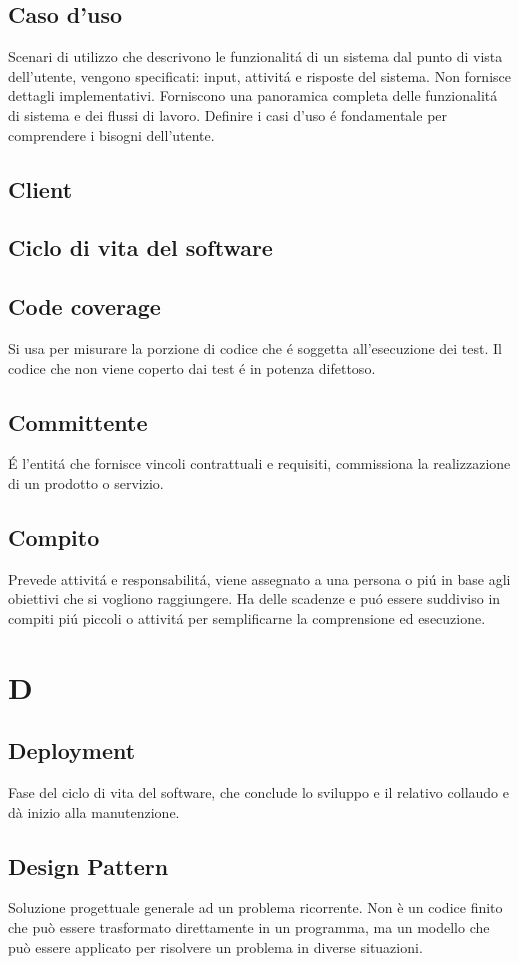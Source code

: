 \documentclass[12pt]{article}
\begin{document}
		\subsection{Caso d'uso}
			Scenari di utilizzo che descrivono le funzionalit\'a di un sistema dal punto di vista dell'utente, vengono specificati: input, attivit\'a e risposte del sistema. Non fornisce dettagli implementativi. Forniscono una panoramica completa delle funzionalit\'a di sistema e dei flussi di lavoro. Definire i casi d'uso \'e fondamentale per comprendere i bisogni dell'utente.
		\subsection{Client} %
			\subsection{Ciclo di vita del software} %
		\subsection{Code coverage}
			Si usa per misurare la porzione di codice che \'e soggetta all'esecuzione dei test. Il codice che non viene coperto dai test \'e in potenza difettoso.
		\subsection{Committente}
			\'E l'entit\'a che fornisce vincoli contrattuali e requisiti, commissiona la realizzazione di un prodotto o servizio.
		\subsection{Compito}
			Prevede attivit\'a e responsabilit\'a, viene assegnato a una persona o pi\'u in base agli obiettivi che si vogliono raggiungere. Ha delle scadenze e pu\'o essere suddiviso in compiti pi\'u piccoli o attivit\'a per semplificarne la comprensione ed esecuzione.
	\clearpage
	\section{D}
		\subsection{Deployment}
		Fase del ciclo di vita del software, che conclude lo sviluppo e il relativo collaudo e dà inizio alla manutenzione.
		\subsection{Design Pattern}
		Soluzione progettuale generale ad un problema ricorrente. Non è un codice finito che può essere trasformato direttamente in un programma, ma un modello che può essere applicato per risolvere un problema in diverse situazioni.
\end{document}
